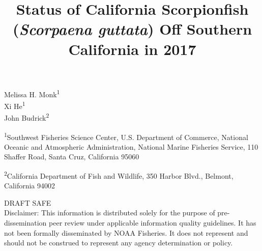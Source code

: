 \documentclass[12pt,]{article}
\title{Status of California Scorpionfish (\emph{Scorpaena guttata}) Off
Southern California in 2017}
\author{}
\date{}
\begin{document}
\maketitle


\begin{center}
\thispagestyle{empty}


\vspace{.5cm}




Melissa H. Monk\textsuperscript{1}\\
Xi He\textsuperscript{1}\\
John Budrick\textsuperscript{2}\\

\vspace{.5cm}

\small
\textsuperscript{1}Southwest Fisheries Science Center, U.S. Department of Commerce, National Oceanic and Atmospheric Administration, National Marine Fisheries Service, 110 Shaffer Road, Santa Cruz, California 95060\\

\vspace{.3cm}

\textsuperscript{2}California Department of Fish and Wildlife, 350 Harbor Blvd., Belmont, California 94002\\


\vspace{.5cm}

\vfill
DRAFT SAFE\\
Disclaimer: This information is distributed solely for the purpose of pre-dissemination
peer review under applicable information quality guidelines. It has not been formally
disseminated by NOAA Fisheries. It does not represent and should not be construed to
represent any agency determination or policy. 

\vspace{.3cm}

\maketitle

\setcounter{page}{1}
\end{center}
\end{document}
